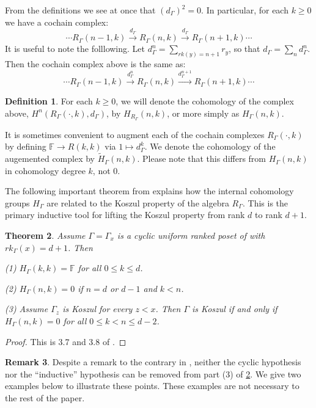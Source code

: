 \documentclass[11pt,righttag]{amsart}
\newtheorem{thm}{Theorem}[section]
\theoremstyle{definition}
\newtheorem{defn}[thm]{Definition}
\newtheorem{rmk}[thm]{Remark}
\begin{document}
From the definitions we see at once that $(d_\Gamma)^2 = 0$.  In particular, for each $k\ge 0$ we have a cochain complex:
$$ \cdots R_\Gamma(n-1,k) \xrightarrow{d_\Gamma} R_\Gamma(n,k)  \xrightarrow{d_\Gamma} R_\Gamma(n+1,k) \cdots $$
It is useful to note the folllowing.  Let $d_\Gamma^n = \sum\limits_{rk(y) = n+1}r_y$, so that $d_\Gamma = \sum_n d_\Gamma^n$. Then the cochain complex above is the same as:
$$ \cdots R_\Gamma(n-1,k) \xrightarrow{d_\Gamma^n} R_\Gamma(n,k)  \xrightarrow{d_\Gamma^{n+1}} R_\Gamma(n+1,k) \cdots $$

\begin{defn}\label{cohomology}
For each $k\ge 0$, we will denote the cohomology of the complex above, $H^n(R_\Gamma(\cdot,k),d_\Gamma)$, by $H_{R_\Gamma}(n,k)$, or more simply as $H_\Gamma(n,k)$.    
\end{defn}

It is sometimes convenient to augment each of the cochain complexes 
$R_\Gamma(\cdot,k)$ by defining  ${{\mathbb F}} \to R(k,k)$ via $1\mapsto d_\Gamma^k$.  We denote the cohomology of the augemented complex 
by $\tilde H_\Gamma(n,k)$. Please note that this differs from $H_\Gamma(n,k)$ in cohomology degree $k$, not 0. 

The following important theorem from \cite{CPS} explains how the internal cohomology groups $H_\Gamma$ are related to the Koszul property of the algebra 
$R_\Gamma$. This is the primary inductive tool for lifting the Koszul property from rank $d$ to rank $d+1$.

\begin{thm}\label{cyclic}
Assume $\Gamma=\Gamma_x$ is a cyclic uniform ranked poset of with $rk_\Gamma(x)=d+1$.   Then

{\rm (1)} $H_\Gamma(k,k) = {{\mathbb F}}$ for all $0\le k\le d$.

{\rm (2)} $H_\Gamma(n,k) = 0$ if $n =d$ or $d-1$ and $k<n$.

{\rm (3)} Assume $\Gamma_z$ is Koszul for every $z<x$.  Then $\Gamma$ is Koszul if and only if $H_\Gamma(n,k) = 0$ for all $0\le k<n\le d-2$.  

\end{thm}
 
 \begin{proof}  This is 3.7 and 3.8 of \cite{CPS}.
 \end{proof}

\begin{rmk} Despite a remark to the contrary in \cite{CPS}, neither the cyclic hypothesis nor the ``inductive'' hypothesis can be removed from part (3) of \ref{cyclic}.    We give two examples below to illustrate these points.  These examples are not necessary to the rest of the paper. 
\end{rmk}
\end{document}
